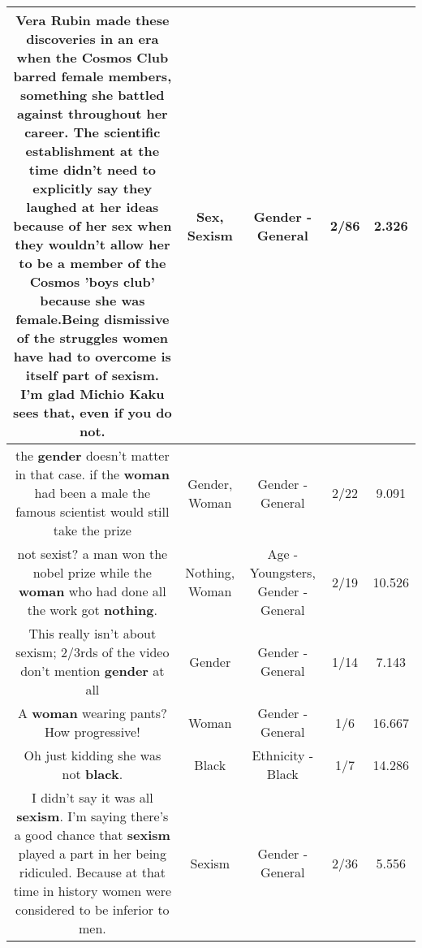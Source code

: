 \documentclass[11pt]{article}
\newlength\mylength
\begin{document}
\begin{center}
\begin{longtable}{|C{.65\mylength}|C{.30\mylength}|C{.12\mylength}|C{.12\mylength}|C{.12\mylength}|}
  \small Vera Rubin made these discoveries in an era when the Cosmos Club barred female members, something she battled against throughout her career. The scientific establishment at the time didn't need to explicitly say they laughed at her ideas because of her \textbf{sex} when they wouldn't allow her to be a member of the Cosmos 'boys club' because she was female.Being dismissive of the struggles women have had to overcome is itself part of \textbf{sexism}. I'm glad Michio Kaku sees that, even if you do not.\normalsize   & Sex, Sexism & Gender - General & 2/86 & 2.326 \\  \hline
  \small the \textbf{gender} doesn't matter in that case. if the \textbf{woman} had been a male the famous scientist would still take the prize\normalsize   & Gender, Woman & Gender - General & 2/22 & 9.091 \\  \hline
  \small not sexist? a man won the nobel prize while the \textbf{woman} who had done all the work got \textbf{nothing}.\normalsize   & Nothing, Woman & Age - Youngsters, Gender - General & 2/19 & 10.526 \\  \hline
  \small This really isn't about sexism; 2/3rds of the video don't mention \textbf{gender} at all\normalsize   & Gender & Gender - General & 1/14 & 7.143 \\  \hline
  \small A \textbf{woman} wearing pants? How progressive!\normalsize   & Woman & Gender - General & 1/6 & 16.667 \\  \hline
  \small Oh just kidding she was not \textbf{black}.\normalsize   & Black & Ethnicity - Black & 1/7 & 14.286 \\  \hline
  \small I didn't say it was all \textbf{sexism}. I'm saying there's a good chance that \textbf{sexism} played a part in her being ridiculed. Because at that time in history women were considered to be inferior to men.\normalsize   & Sexism & Gender - General & 2/36 & 5.556 \\  \hline

\end{longtable}
\end{center}
\end{document}

